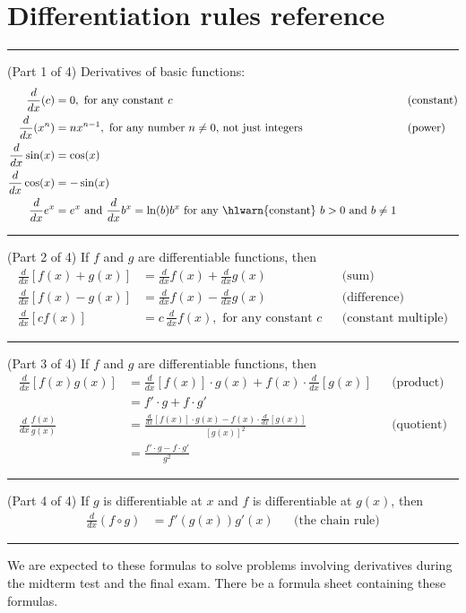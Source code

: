 \documentclass[../main.tex]{subfiles}
\begin{document}
 \section{Differentiation rules reference}

  \hrule
  (Part 1 of 4) Derivatives of basic functions: 
  \begin{align*}
    \frac{d}{dx} (c)
    &= 0, \text{ for any constant \(c\)}
    && \text{(constant)} \\
    \frac{d}{dx} (x^{n})
    &= n x^{n-1}, \text{ for any number \(n \ne 0\), not just integers} 
    && \text{(power)} \\
    \frac{d}{dx} \sin(x)
    &= \cos(x) \\
    \frac{d}{dx} \cos(x)
    &= -\sin(x) \\
    \frac{d}{dx} e^{x} &= e^{x} \text{ and } \frac{d}{dx}b^{x} = \ln(b)b^{x} \text{ for any \hlwarn{constant} } b > 0 \text{ and } b \ne 1
  \end{align*}

  \hrule

  (Part 2 of 4) If \(f\) and \(g\) are differentiable functions, then
  \begin{align*}
    \frac{d}{dx} [f(x) + g(x)] 
    &= \frac{d}{dx}f(x) + \frac{d}{dx}g(x)
    && \text{(sum)} \\[1em]
    \frac{d}{dx} [f(x) - g(x)] 
    &= \frac{d}{dx}f(x) - \frac{d}{dx}g(x)
    && \text{(difference)} \\[1em]
    \frac{d}{dx} [c f(x)] 
    &= c \, \frac{d}{dx} f(x), \text{ for any constant \(c\)}
    && \text{(constant multiple)}
  \end{align*}

  \hrule

  (Part 3 of 4) If \(f\) and \(g\) are differentiable functions, then
  \begin{align*}
    \frac{d}{dx} [f(x)g(x)] 
    &= { \frac{d}{dx} [f(x)] \cdot g(x)+ f(x) \cdot \frac{d}{dx}[g(x)]}
    && \text{(product)} \\
    &= f' \cdot g + f \cdot g' \\[1em]
    \frac{d}{dx} \frac{f(x)}{g(x)}
    &= {\frac{\frac{d}{dx} [f(x)] \cdot g(x) - f(x) \cdot \frac{d}{dx}[g(x)] }{ [g(x)]^{2} }}
    && \text{(quotient)} \\
    &= \frac{f' \cdot g - f \cdot g'}{g^{2}}
  \end{align*}

  \hrule

  (Part 4 of 4) If \(g\) is differentiable at \(x\) and \(f\) is differentiable at \(g(x)\), then 
  \begin{align*}
    \frac{d}{dx} (f \circ g)
    &= f'(g(x)) g'(x)
    &&\text{(the chain rule)}
  \end{align*}

  \hrule

  \faExclamationTriangle{} We are expected to  these formulas to solve problems involving derivatives during the midterm test and the final exam. There  be a formula sheet containing these formulas.
\end{document}
